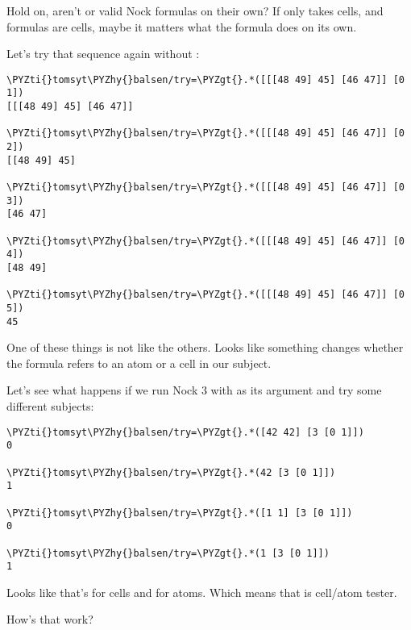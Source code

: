 Hold on, aren't \kode{[0 1]} or \kode{[0 5]} valid Nock formulas on their own?  If 
only takes cells, and formulas are cells, maybe it matters what the formula
does on its own.

Let's try that sequence again without :
\begin{framed_shaded}
\begin{Verbatim}[fontsize=\relsize{-2.5},fontseries=b,commandchars=\\\{\}]
\PYZti{}tomsyt\PYZhy{}balsen/try=\PYZgt{}.*([[[48 49] 45] [46 47]] [0 1])
[[[48 49] 45] [46 47]]

\PYZti{}tomsyt\PYZhy{}balsen/try=\PYZgt{}.*([[[48 49] 45] [46 47]] [0 2])
[[48 49] 45]

\PYZti{}tomsyt\PYZhy{}balsen/try=\PYZgt{}.*([[[48 49] 45] [46 47]] [0 3])
[46 47]

\PYZti{}tomsyt\PYZhy{}balsen/try=\PYZgt{}.*([[[48 49] 45] [46 47]] [0 4])
[48 49]

\PYZti{}tomsyt\PYZhy{}balsen/try=\PYZgt{}.*([[[48 49] 45] [46 47]] [0 5])
45
\end{Verbatim}
\end{framed_shaded}
One of these things is not like the others. Looks like something changes
whether the formula \kode{[0 n]} refers to an atom or a cell in our subject.

Let's see what happens if we run Nock 3 with \kode{[0 1]} as its argument and try
some different subjects:
\begin{framed_shaded}
\begin{Verbatim}[fontsize=\relsize{-2.5},fontseries=b,commandchars=\\\{\}]
\PYZti{}tomsyt\PYZhy{}balsen/try=\PYZgt{}.*([42 42] [3 [0 1]])
0

\PYZti{}tomsyt\PYZhy{}balsen/try=\PYZgt{}.*(42 [3 [0 1]])
1

\PYZti{}tomsyt\PYZhy{}balsen/try=\PYZgt{}.*([1 1] [3 [0 1]])
0

\PYZti{}tomsyt\PYZhy{}balsen/try=\PYZgt{}.*(1 [3 [0 1]])
1
\end{Verbatim}
\end{framed_shaded}
Looks like that's  for cells and  for atoms. Which means that  is
cell/atom tester. 

How's that work?

